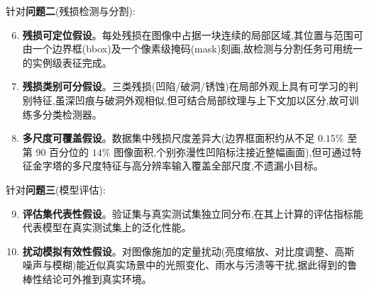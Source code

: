 针对\textbf{问题二}(残损检测与分割):

\begin{enumerate}\setcounter{enumi}{5}
\item \textbf{残损可定位假设}。每处残损在图像中占据一块连续的局部区域,其位置与范围可由一个边界框(bbox)及一个像素级掩码(mask)刻画,故检测与分割任务可用统一的实例级表征完成。

\item \textbf{残损类别可分假设}。三类残损(凹陷/破洞/锈蚀)在局部外观上具有可学习的判别特征,虽深凹痕与破洞外观相似,但可结合局部纹理与上下文加以区分,故可训练多分类检测器。

\item \textbf{多尺度可覆盖假设}。数据集中残损尺度差异大(边界框面积约从不足 $0.15\%$ 至第 90 百分位的 $14\%$ 图像面积,个别弥漫性凹陷标注接近整幅画面),但可通过特征金字塔的多尺度特征与高分辨率输入覆盖全部尺度,不遗漏小目标。

\end{enumerate}

针对\textbf{问题三}(模型评估):

\begin{enumerate}\setcounter{enumi}{8}
\item \textbf{评估集代表性假设}。验证集与真实测试集独立同分布,在其上计算的评估指标能代表模型在真实测试集上的泛化性能。

\item \textbf{扰动模拟有效性假设}。对图像施加的定量扰动(亮度缩放、对比度调整、高斯噪声与模糊)能近似真实场景中的光照变化、雨水与污渍等干扰,据此得到的鲁棒性结论可外推到真实环境。

\end{enumerate}
